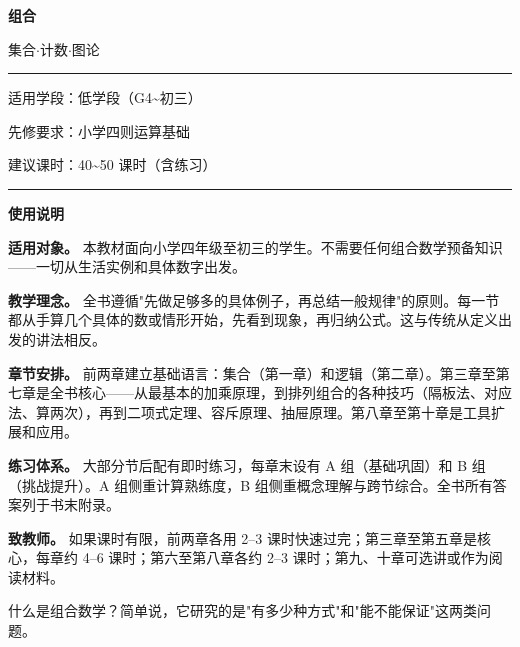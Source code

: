 \documentclass[a4paper,12pt]{ctexart}
\begin{document}
\pagestyle{empty}

\vspace*{2.5cm}
{\centering
  {\Huge\bfseries\color{mainblue} 组合}\par
  \vspace{0.6cm}
  {\Large 集合$\cdot$计数$\cdot$图论}\par
  \vspace{2cm}
  \rule{0.5\textwidth}{0.4pt}\par
  \vspace{1.2cm}
  {\normalsize 适用学段：低学段（G4\~{}初三）}\par
  \vspace{0.4cm}
  {\normalsize 先修要求：小学四则运算基础}\par
  \vspace{0.4cm}
  {\normalsize 建议课时：40\~{}50 课时（含练习）}\par
  \vspace{1.2cm}
  \rule{0.5\textwidth}{0.4pt}
}
\newpage

\vspace*{0.5cm}
{\Large\bfseries\color{mainblue} 使用说明}\par
\vspace{0.3cm}

\textbf{适用对象。} 本教材面向小学四年级至初三的学生。不需要任何组合数学预备知识——一切从生活实例和具体数字出发。

\textbf{教学理念。} 全书遵循"先做足够多的具体例子，再总结一般规律"的原则。每一节都从手算几个具体的数或情形开始，先看到现象，再归纳公式。这与传统从定义出发的讲法相反。

\textbf{章节安排。} 前两章建立基础语言：集合（第一章）和逻辑（第二章）。第三章至第七章是全书核心——从最基本的加乘原理，到排列组合的各种技巧（隔板法、对应法、算两次），再到二项式定理、容斥原理、抽屉原理。第八章至第十章是工具扩展和应用。

\textbf{练习体系。} 大部分节后配有即时练习，每章末设有 A 组（基础巩固）和 B 组（挑战提升）。A 组侧重计算熟练度，B 组侧重概念理解与跨节综合。全书所有答案列于书末附录。

\textbf{致教师。} 如果课时有限，前两章各用 2--3 课时快速过完；第三章至第五章是核心，每章约 4--6 课时；第六至第八章各约 2--3 课时；第九、十章可选讲或作为阅读材料。

\newpage

\pagestyle{plain}


什么是组合数学？简单说，它研究的是"有多少种方式"和"能不能保证"这两类问题。
\end{document}
